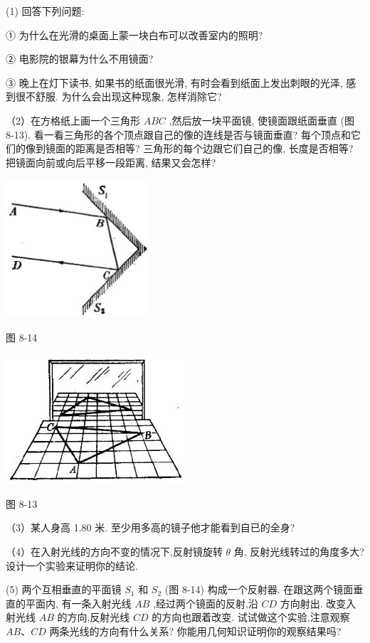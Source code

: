 \documentclass[10pt]{article}
\begin{document}
(1) 回答下列问题:

① 为什么在光滑的桌面上蒙一块白布可以改善室内的照明?

② 电影院的银幕为什么不用镜面?

③ 晚上在灯下读书, 如果书的纸面很光滑, 有时会看到纸面上发出刺眼的光泽, 感到很不舒服. 为什么会出现这种现象, 怎样消除它?

（2）在方格纸上画一个三角形 \({ABC}\) ,然后放一块平面镜, 使镜面跟纸面垂直 (图 8-13). 看一看三角形的各个顶点跟自己的像的连线是否与镜面垂直? 每个顶点和它们的像到镜面的距离是否相等? 三角形的每个边跟它们自己的像, 长度是否相等? 把镜面向前或向后平移一段距离, 结果又会怎样?

\begin{center}
\includegraphics[max width=0.4\textwidth]{images/01913056-1f15-74d8-9184-9aab52c9d66b_253_713951.jpg}
\end{center}

图 8-14

\begin{center}
\includegraphics[max width=0.5\textwidth]{images/01913056-1f15-74d8-9184-9aab52c9d66b_253_373594.jpg}
\end{center}

图 8-13

（3）某人身高 1.80 米. 至少用多高的镜子他才能看到自已的全身?

（4）在入射光线的方向不变的情况下,反射镜旋转 \(\theta\) 角, 反射光线转过的角度多大? 设计一个实验来证明你的结论.

(5) 两个互相垂直的平面镜 \({S}_{1}\) 和 \({S}_{2}\) (图 8-14) 构成一个反射器. 在跟这两个镜面垂直的平面内, 有一条入射光线 \({AB}\) ,经过两个镜面的反射,沿 \({CD}\) 方向射出. 改变入射光线 \({AB}\) 的方向,反射光线 \({CD}\) 的方向也跟着改变. 试试做这个实验,注意观察 \({AB}\text{、}{CD}\) 两条光线的方向有什么关系? 你能用几何知识证明你的观察结果吗?
\end{document}
